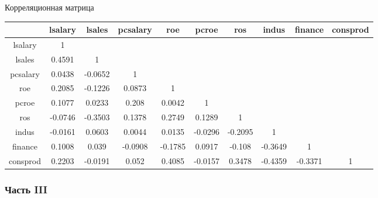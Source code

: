 Корреляционная матрица

\begin{tabular}{ccc ccc ccc c}
\toprule
& lsalary & lsales & pcsalary	& roe & pcroe & ros & indus	& finance & consprod \\
\midrule
lsalary	& 1 &&&& &&&& \\
lsales	& 0.4591 & 1 &&& &&&& \\	
pcsalary & 0.0438 & -0.0652 & 1 &&& &&& \\
roe	& 0.2085 & -0.1226 & 0.0873 & 1 &&&&& \\
pcroe & 0.1077 & 0.0233	& 0.208	& 0.0042 & 1 &&&& \\
ros & -0.0746 & -0.3503	& 0.1378 & 0.2749 &	0.1289 & 1 &&& \\
indus & -0.0161	& 0.0603 & 0.0044 & 0.0135 & -0.0296 & -0.2095 & 1 && \\	
finance & 0.1008 & 0.039 & -0.0908 & -0.1785 & 0.0917 & -0.108 & -0.3649 & 1 & \\
consprod & 0.2203 & -0.0191 & 0.052 & 0.4085 & -0.0157  & 0.3478 & -0.4359 & -0.3371 & 1 \\
\bottomrule
\end{tabular}

\subsubsection*{Часть III}


